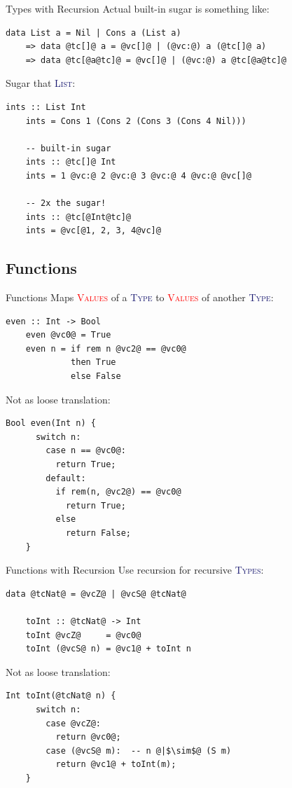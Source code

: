 \documentclass[xcolor={usenames,dvipsnames}]{beamer}
\newcommand{\htycon}[1]{\textcolor{MidnightBlue}{\textsc{#1}}}
\newcommand{\hvalcon}[1]{\textcolor{Red}{\textsc{#1}}}
\begin{document}
\begin{frame}[fragile]{Types with Recursion}
  Actual built-in sugar is something like:
  \begin{lstlisting}[style=hask]
       data List a = Nil | Cons a (List a)
    => data @tc[]@ a = @vc[]@ | (@vc:@) a (@tc[]@ a)
    => data @tc[@a@tc]@ = @vc[]@ | (@vc:@) a @tc[@a@tc]@
  \end{lstlisting}

  Sugar that \htycon{List}:
  \begin{lstlisting}[style=hask]
    ints :: List Int 
    ints = Cons 1 (Cons 2 (Cons 3 (Cons 4 Nil)))

    -- built-in sugar
    ints :: @tc[]@ Int
    ints = 1 @vc:@ 2 @vc:@ 3 @vc:@ 4 @vc:@ @vc[]@

    -- 2x the sugar!
    ints :: @tc[@Int@tc]@
    ints = @vc[@1, 2, 3, 4@vc]@
  \end{lstlisting}
\end{frame}


\subsection{Functions}

\begin{frame}[fragile]{Functions}
  Maps \hvalcon{Values} of a \htycon{Type} to \hvalcon{Values} of another \htycon{Type}:
  \begin{lstlisting}[style=hask]
    even :: Int -> Bool
    even @vc0@ = True
    even n = if rem n @vc2@ == @vc0@
             then True
             else False
  \end{lstlisting}

  Not as loose translation:
  \begin{lstlisting}[style=hask]
    Bool even(Int n) {
      switch n:
        case n == @vc0@:
          return True;
        default:
          if rem(n, @vc2@) == @vc0@
            return True;
          else
            return False;
    }
  \end{lstlisting}
\end{frame}

\begin{frame}[fragile]{Functions with Recursion}
  Use recursion for recursive \htycon{Types}:
  \begin{lstlisting}[style=hask]
    data @tcNat@ = @vcZ@ | @vcS@ @tcNat@

    toInt :: @tcNat@ -> Int
    toInt @vcZ@     = @vc0@
    toInt (@vcS@ n) = @vc1@ + toInt n
  \end{lstlisting}

  Not as loose translation:
  \begin{lstlisting}[style=hask]
    Int toInt(@tcNat@ n) {
      switch n:
        case @vcZ@:
          return @vc0@;
        case (@vcS@ m):  -- n @|$\sim$@ (S m)
          return @vc1@ + toInt(m);
    }
  \end{lstlisting}
\end{frame}
\end{document}
